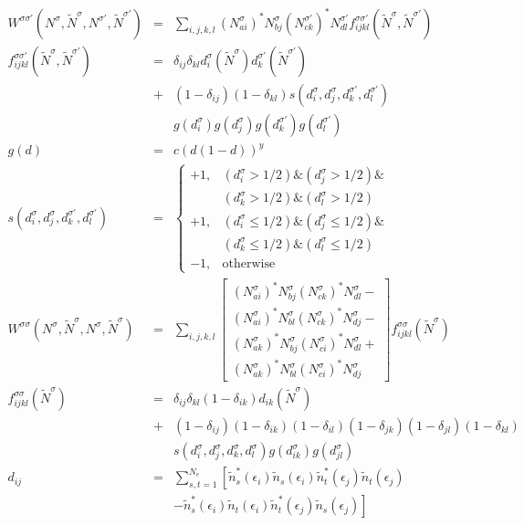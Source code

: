 \documentclass[aip,graphicx]{revtex4-1}
\newcommand{\nNq}[1]{N^{#1}}
\newcommand{\nNs}{\nNq{\sigma}}
\newcommand{\nNt}{\nNq{\sigma'}}
\newcommand{\nNsd}[1]{\left(\nNq{\sigma}_{#1}\right)^{*}}
\newcommand{\nNtd}[1]{\left(\nNq{\sigma'}_{#1}\right)^{*}}
\newcommand{\tNq}[1]{\tilde{N}^{#1}}
\newcommand{\tNs}{\tNq{\sigma}}
\newcommand{\tNt}{\tNq{\sigma'}}
\newcommand{\dq}[2]{d_{#1}^{#2}}
\newcommand{\ds}[1]{\dq{#1}{\sigma}}
\newcommand{\dt}[1]{\dq{#1}{\sigma'}}
\newcommand{\Wqq}[2]{W^{#1 #2}}
\newcommand{\Wss}{\Wqq{\sigma}{\sigma}}
\newcommand{\Wst}{\Wqq{\sigma}{\sigma'}}
\begin{document}
\begin{itemize}
\begin{eqnarray}
      \Wst(\nNs,\tNs,\nNt,\tNt) &=& \sum_{i,j,k,l}\nNsd{ai}\nNs_{bj}\nNtd{ck}\nNt_{dl}f^{\sigma\sigma'}_{ijkl}(\tNs,\tNt) \\
      f^{\sigma\sigma'}_{ijkl}(\tNs,\tNt) 
               &=& \delta_{ij}\delta_{kl}\ds{i}(\tNs)\dt{k}(\tNt) \nonumber \\
               &+& (1-\delta_{ij})(1-\delta_{kl})s(\ds{i},\ds{j},\dt{k},\dt{l}) \nonumber \\
               &&  g(\ds{i})g(\ds{j})g(\dt{k})g(\dt{l}) \\
      g(d) &=& c(d(1-d))^y \\
      s(\ds{i},\ds{j},\dt{k},\dt{l}) &=& \left\{\begin{array}{cl}
      +1, & (\ds{i} > 1/2) \& (\ds{j} > 1/2) \& \\
          & (\ds{k} > 1/2) \& (\ds{l} > 1/2) \\
      +1, & (\ds{i} \leq 1/2) \& (\ds{j} \leq 1/2) \& \\
          & (\ds{k} \leq 1/2) \& (\ds{l} \leq 1/2) \\
      -1, & \mathrm{otherwise}
      \end{array}
      \right. \\
      \Wss(\nNs,\tNs,\nNs,\tNs) &=& \sum_{i,j,k,l} \left[\begin{array}{c}
      \nNsd{ai}\nNs_{bj}\nNsd{ck}\nNs_{dl} - \\
      \nNsd{ai}\nNs_{bl}\nNsd{ck}\nNs_{dj} - \\
      \nNsd{ak}\nNs_{bj}\nNsd{ci}\nNs_{dl} + \\
      \nNsd{ak}\nNs_{bl}\nNsd{ci}\nNs_{dj}
      \end{array}\right] f^{\sigma\sigma}_{ijkl}(\tNs) \\
      f^{\sigma\sigma}_{ijkl}(\tNs)
           &=& \delta_{ij}\delta_{kl}(1-\delta_{ik})d_{ik}(\tNs) \nonumber \\
           &+& (1-\delta_{ij})(1-\delta_{ik})(1-\delta_{il})(1-\delta_{jk})(1-\delta_{jl})(1-\delta_{kl}) \nonumber \\
           &&  s(\ds{i},\ds{j},\ds{k},\ds{l})g(\ds{ik})g(\ds{jl}) \\
      d_{ij} &=& \sum_{s,t=1}^{N_e}\left[\tilde{n}_s^*(\epsilon_i)\tilde{n}_s(\epsilon_i)\tilde{n}_t^*(\epsilon_j)\tilde{n}_t(\epsilon_j)\right. \nonumber \\
      && \left.-\tilde{n}_s^*(\epsilon_i)\tilde{n}_t(\epsilon_i)\tilde{n}_t^*(\epsilon_j)\tilde{n}_s(\epsilon_j)\right]
      \end{eqnarray}

\end{itemize}
\end{document}
